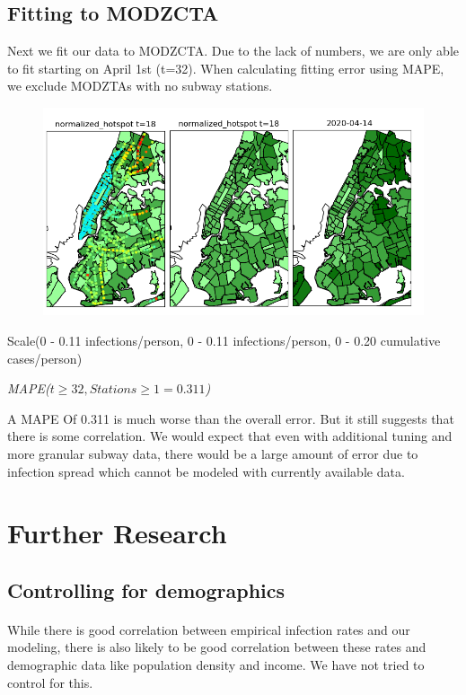 \documentclass[12pt, a4, epsf] {article}
\theoremstyle{plain}
\theoremstyle{definition}
\begin{document}
\subsection{Fitting to MODZCTA}
Next we fit our data to MODZCTA. Due to the lack of numbers, we are only able to fit starting on April 1st (t=32). When calculating fitting error using MAPE, we exclude MODZTAs with no subway stations.
\begin{figure}[htbp]
\includegraphics[width = 1.0\textwidth]{Scratch_Visuals/NYC_Geo_Fitting.png}
\end{figure}
\FloatBarrier
\begin{small}
Scale(0 - 0.11 infections/person, 0 - 0.11 infections/person, 0 - 0.20 cumulative cases/person) 
\end{small}
\FloatBarrier
\begin{small}
\textit{MAPE($t \geq 32, Stations \geq 1 = 0.311$)}\\
\end{small}
\FloatBarrier
A MAPE Of 0.311 is much worse than the overall error. But it still suggests that there is some correlation. We would expect that even with additional tuning and more granular subway data, there would be a large amount of error due to infection spread which cannot be modeled with currently available data.
\section{Further Research}
\subsection{Controlling for demographics}
\paragraph{}
While there is good correlation between empirical infection rates and our modeling, there is also likely to be good correlation between these rates and demographic data like population density and income. We have not tried to control for this.
\end{document}
